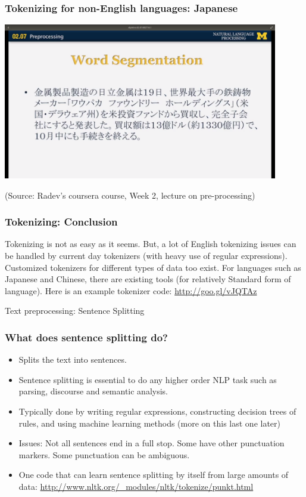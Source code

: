 \documentclass{beamer}
\begin{document}
\begin{frame}
\frametitle{Tokenizing for non-English languages: Japanese}
\begin{center}
\includegraphics[width=0.9\textwidth]{JapSegmentation-Radev.png}
\end{center}
(Source: Radev's coursera course, Week 2, lecture on pre-processing)
\end{frame}

\begin{frame}
\frametitle{Tokenizing: Conclusion}
Tokenizing is not as easy as it seems. But, a lot of English tokenizing issues can be handled by current day tokenizers (with heavy use of regular expressions). Customized tokenizers for different types of data too exist. For languages such as Japanese and Chinese, there are existing tools (for relatively Standard form of language).
\bigskip Here is an example tokenizer code: \url{http://goo.gl/vJQTAz}

\end{frame}

\begin{frame}
\begin{center}
\Large Text preprocessing: Sentence Splitting
\end{center}
\end{frame}

\begin{frame}
\frametitle{What does sentence splitting do?}
\begin{itemize}
\item Splits the text into sentences. 
\item Sentence splitting is essential to do any higher order NLP task such as parsing, discourse and semantic analysis. 
\item Typically done by writing regular expressions, constructing decision trees of rules, and using machine learning methods (more on this last one later)
\item Issues: Not all sentences end in a full stop. Some have other punctuation markers. Some punctuation can be ambiguous.
\item One code that can learn sentence splitting by itself from large amounts of data: \url{http://www.nltk.org/\_modules/nltk/tokenize/punkt.html}
\end{itemize}
\end{frame}
\end{document}
